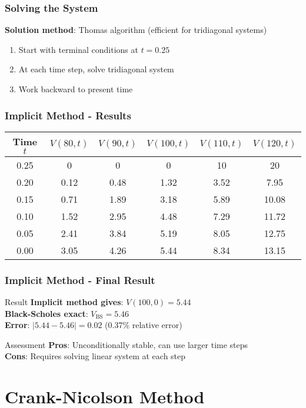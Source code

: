 \documentclass[aspectratio=169]{beamer}
\begin{document}
\begin{frame}
\frametitle{Solving the System}
\textbf{Solution method}: Thomas algorithm (efficient for tridiagonal systems)

\begin{enumerate}
\item Start with terminal conditions at \(t = 0.25\)
\item At each time step, solve tridiagonal system
\item Work backward to present time
\end{enumerate}
\end{frame}

\begin{frame}
\frametitle{Implicit Method - Results}
\begin{center}
\begin{tabular}{c|c|c|c|c|c}
Time \(t\) & \(V(80,t)\) & \(V(90,t)\) & \(V(100,t)\) & \(V(110,t)\) & \(V(120,t)\) \\
\hline
0.25 & 0 & 0 & 0 & 10 & 20 \\
0.20 & 0.12 & 0.48 & 1.32 & 3.52 & 7.95 \\
0.15 & 0.71 & 1.89 & 3.18 & 5.89 & 10.08 \\
0.10 & 1.52 & 2.95 & 4.48 & 7.29 & 11.72 \\
0.05 & 2.41 & 3.84 & 5.19 & 8.05 & 12.75 \\
0.00 & 3.05 & 4.26 & 5.44 & 8.34 & 13.15 \\
\end{tabular}
\end{center}
\end{frame}

\begin{frame}
\frametitle{Implicit Method - Final Result}
\begin{block}{Result}
\textbf{Implicit method gives}: \(V(100, 0) = 5.44\)\\
\textbf{Black-Scholes exact}: \(V_{\text{BS}} = 5.46\)\\
\textbf{Error}: \(|5.44 - 5.46| = 0.02\) (0.37\% relative error)
\end{block}

\begin{block}{Assessment}
\textbf{Pros}: Unconditionally stable, can use larger time steps\\
\textbf{Cons}: Requires solving linear system at each step
\end{block}
\end{frame}

\section{Crank-Nicolson Method}
\end{document}
